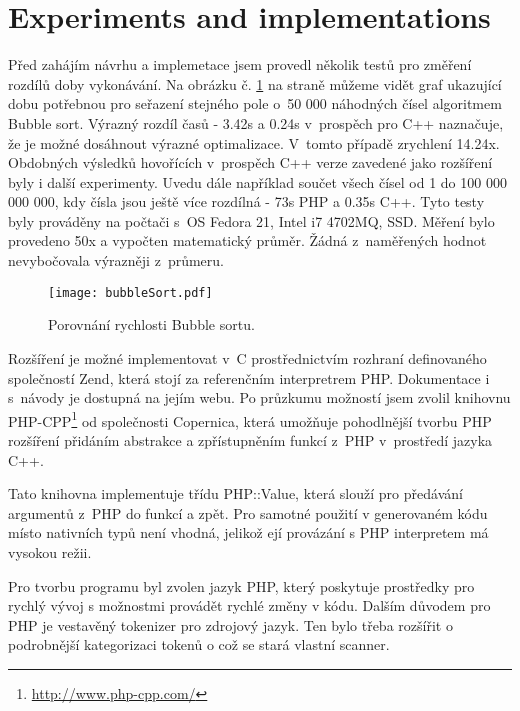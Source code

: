\documentclass[czech]{ExcelAtFIT}
\begin{document}
\section{Experiments and implementations}

	Před zahájím návrhu a implemetace jsem provedl několik testů pro změření rozdílů doby vykonávání. Na obrázku č. \ref{fig:bubbleSort} na straně \pageref{fig:bubbleSort} můžeme vidět graf ukazující dobu potřebnou pro seřazení stejného pole o~50 000 náhodných čísel algoritmem Bubble sort. Výrazný rozdíl časů - 3.42s a 0.24s v~prospěch pro C++ naznačuje, že je možné dosáhnout výrazné optimalizace. V~tomto případě zrychlení 14.24x. Obdobných výsledků hovořících v~prospěch C++ verze zavedené jako rozšíření byly i další experimenty. Uvedu dále například součet všech čísel od 1 do 100 000 000 000, kdy čísla jsou ještě více rozdílná - 73s PHP a 0.35s C++. Tyto testy byly prováděny na počtači s~OS Fedora 21, Intel i7 4702MQ, SSD. Měření bylo provedeno 50x a vypočten matematický průměr. Žádná z~naměřených hodnot nevybočovala výrazněji z~průmeru.


\begin{figure}[t]
	\centering
	\texttt{[image: bubbleSort.pdf]}
	\caption{Porovnání rychlosti Bubble sortu.}
	\label{fig:bubbleSort}
\end{figure}

	Rozšíření je možné implementovat v~C prostřednictvím rozhraní definovaného společností Zend, která stojí za referenčním interpretrem PHP. Dokumentace i s~návody je dostupná na jejím webu. Po průzkumu možností jsem zvolil knihovnu PHP-CPP\footnote{\url{http://www.php-cpp.com/}} od společnosti Copernica, která umožňuje pohodlnější tvorbu PHP rozšíření přidáním abstrakce a zpřístupněním funkcí z~PHP v~prostředí jazyka C++.

	Tato knihovna implementuje třídu PHP::Value, která slouží pro předávání argumentů z~PHP do funkcí a zpět. Pro samotné použití v generovaném kódu místo nativních typů není vhodná, jelikož ejí provázání s PHP interpretem má vysokou režii.

	Pro tvorbu programu byl zvolen jazyk PHP, který poskytuje prostředky pro rychlý vývoj s možnostmi provádět rychlé změny v kódu. Dalším důvodem pro PHP je vestavěný tokenizer pro zdrojový jazyk. Ten bylo třeba rozšířit o podrobnější kategorizaci tokenů o což se stará vlastní scanner.
\end{document}
